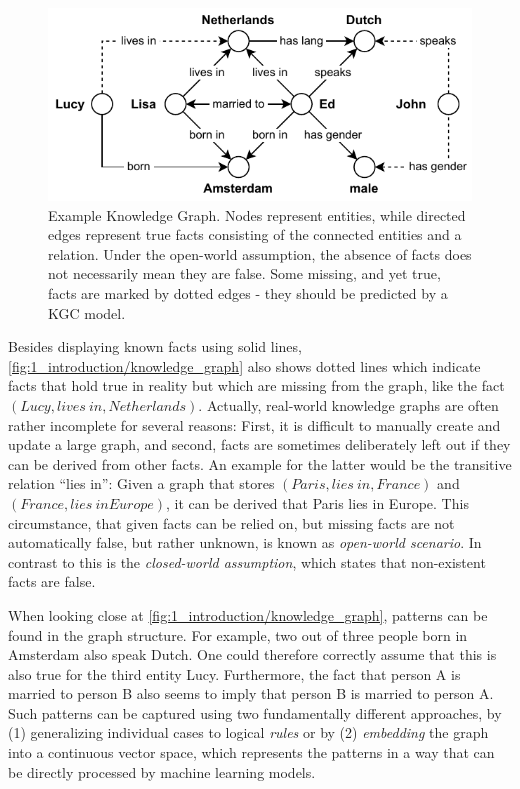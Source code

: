 \begin{figure}[t]
    \centering
    \includegraphics[]{1_introduction/knowledge_graph}
    \caption{Example Knowledge Graph. Nodes represent entities, while directed edges represent true facts consisting of the connected entities and a relation. Under the open-world assumption, the absence of facts does not necessarily mean they are false. Some missing, and yet true, facts are marked by dotted edges - they should be predicted by a KGC model.}
    \label{fig:1_introduction/knowledge_graph}
\end{figure}

Besides displaying known facts using solid lines, \autoref{fig:1_introduction/knowledge_graph} also shows dotted lines which indicate facts that hold true in reality but which are missing from the graph, like the fact $(Lucy, lives~in, Netherlands)$. Actually, real-world knowledge graphs are often rather incomplete for several reasons: First, it is difficult to manually create and update a large graph, and second, facts are sometimes deliberately left out if they can be derived from other facts. An example for the latter would be the transitive relation ``lies in'': Given a graph that stores $(Paris, lies~in, France)$ and $(France, lies~in Europe)$, it can be derived that Paris lies in Europe. This circumstance, that given facts can be relied on, but missing facts are not automatically false, but rather unknown, is known as \emph{open-world scenario}. In contrast to this is the \emph{closed-world assumption}, which states that non-existent facts are false.

When looking close at \autoref{fig:1_introduction/knowledge_graph}, patterns can be found in the graph structure. For example, two out of three people born in Amsterdam also speak Dutch. One could therefore correctly assume that this is also true for the third entity Lucy. Furthermore, the fact that person A is married to person B also seems to imply that person B is married to person A. Such patterns can be captured using two fundamentally different approaches, by (1) generalizing individual cases to logical \emph{rules} or by (2) \emph{embedding} the graph into a continuous vector space, which represents the patterns in a way that can be directly processed by machine learning models.

